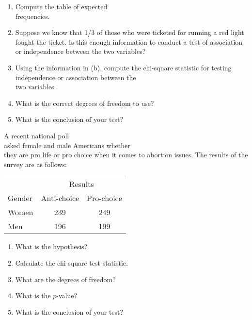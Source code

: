 \documentclass[11pt]{book}\usepackage[]{graphicx}\usepackage[]{color}
\begin{document}
\begin{exercises}
\begin{exercise}
\begin{enumerate}
  \item Compute the table of expected \\ frequencies.
  \item Suppose we know that 1/3 of those who were ticketed for running a red light \\ fought the ticket.  Is this enough information to conduct a test of association or independence between the two variables?
  \item Using the information in (b), compute the chi-square statistic for testing independence or association between the \\ two variables.
  \item What is the correct degrees of freedom to use?
  \item What is the conclusion of your test?
\end{enumerate}

\end{exercise}
\begin{solution} %

\end{solution}

\begin{exercise} %



A recent national poll \\ asked female and male Americans whether \\ they are pro life or pro choice when it comes to abortion issues.  The results of the survey are as follows: 

\begin{table}[ht]
\centering
\begin{tabular}{@{} lcc @{}} \hline
& \multicolumn{2}{c}{Results} \\
Gender & Anti-choice & Pro-choice  \\ \hline
Women  & 239 & 249   \\
Men   & 196 & 199   \\ \hline
\end{tabular}
\end{table}

\begin{enumerate}
  \item What is the hypothesis?
  \item Calculate the chi-square test statistic.
  \item What are the degrees of freedom?
  \item What is the $p$-value?
  \item What is the conclusion of your test?
\end{enumerate}


\end{exercise}
\end{exercises}
\end{document}
